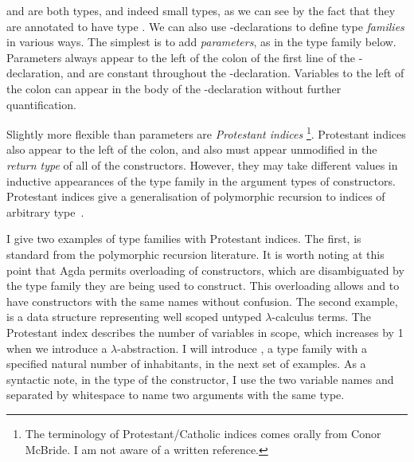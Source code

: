 \noindent
\begin{minipage}[t]{0.5\textwidth}
\end{minipage}
\begin{minipage}[t]{0.5\textwidth}
\end{minipage}

 and  are both types, and indeed
small types, as we can see by the fact that they are annotated to have type
.
We can also use -declarations to define type \emph{families}
in various ways.
The simplest is to add \emph{parameters}, as in the type family
 below.
Parameters always appear to the left of the colon of the first line of the
-declaration, and are constant throughout the
-declaration.
Variables to the left of the colon can appear in the body of the
-declaration without further quantification.


Slightly more flexible than parameters are \emph{Protestant indices}%
\footnote{The terminology of Protestant/Catholic indices comes orally from Conor
McBride. I am not aware of a written reference.}.
Protestant indices also appear to the left of the colon, and also must appear
unmodified in the \emph{return type} of all of the constructors.
However, they may take different values in inductive appearances of the type
family in the argument types of constructors.
Protestant indices give a generalisation of polymorphic
recursion to indices of arbitrary type~\citep{Mycroft84,Henglein93}.

I give two examples of type families with Protestant indices.
The first,  is standard from the polymorphic recursion
literature.
It is worth noting at this point that Agda permits overloading of constructors,
which are disambiguated by the type family they are being used to construct.
This overloading allows  and  to
have constructors with the same names without confusion.
The second example,  is a data structure representing
well scoped untyped $\lambda$-calculus terms.
The Protestant index  describes the number of variables in scope,
which increases by 1 when we introduce a $\lambda$-abstraction.
I will introduce , a type family with a specified natural
number of inhabitants, in the next set of examples.
As a syntactic note, in the type of the 
constructor, I use the two variable names  and 
separated by whitespace to name two arguments with the same type.

